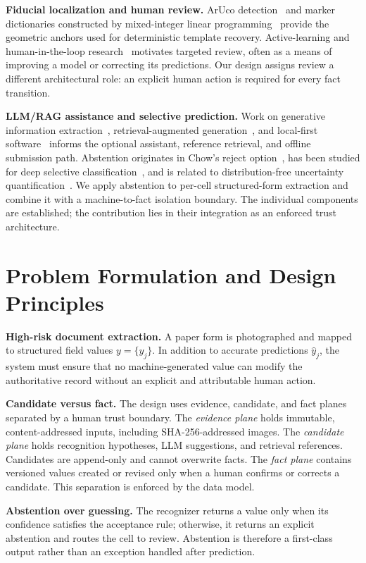 \documentclass[runningheads]{llncs}
\begin{document}
\textbf{Fiducial localization and human review.} ArUco detection~\cite{aruco} and marker dictionaries constructed by mixed-integer linear programming~\cite{milp} provide the geometric anchors used for deterministic template recovery. Active-learning and human-in-the-loop research~\cite{budd} motivates targeted review, often as a means of improving a model or correcting its predictions. Our design assigns review a different architectural role: an explicit human action is required for every fact transition.

\textbf{LLM/RAG assistance and selective prediction.} Work on generative information extraction~\cite{llmgie}, retrieval-augmented generation~\cite{rag}, and local-first software~\cite{localfirst} informs the optional assistant, reference retrieval, and offline submission path. Abstention originates in Chow's reject option~\cite{chow}, has been studied for deep selective classification~\cite{geifman}, and is related to distribution-free uncertainty quantification~\cite{angelopoulos}. We apply abstention to per-cell structured-form extraction and combine it with a machine-to-fact isolation boundary. The individual components are established; the contribution lies in their integration as an enforced trust architecture.

\section{Problem Formulation and Design Principles}
\textbf{High-risk document extraction.} A paper form is photographed and mapped to structured field values $y=\{y_j\}$. In addition to accurate predictions $\hat y_j$, the system must ensure that no machine-generated value can modify the authoritative record without an explicit and attributable human action.

\textbf{Candidate versus fact.} The design uses evidence, candidate, and fact planes separated by a human trust boundary. The \emph{evidence plane} holds immutable, content-addressed inputs, including SHA-256-addressed images. The \emph{candidate plane} holds recognition hypotheses, LLM suggestions, and retrieval references. Candidates are append-only and cannot overwrite facts. The \emph{fact plane} contains versioned values created or revised only when a human confirms or corrects a candidate. This separation is enforced by the data model.

\textbf{Abstention over guessing.} The recognizer returns a value only when its confidence satisfies the acceptance rule; otherwise, it returns an explicit abstention and routes the cell to review. Abstention is therefore a first-class output rather than an exception handled after prediction.
\end{document}
